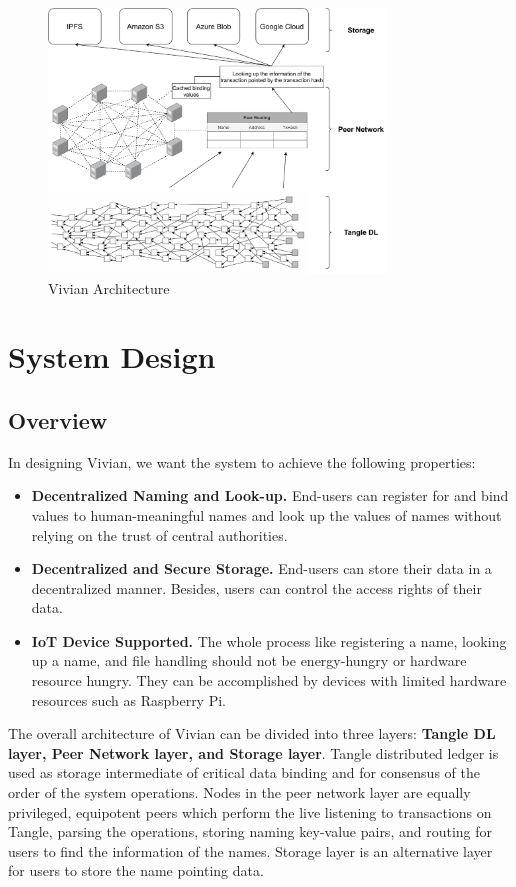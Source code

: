 \begin{figure}[ht]
    \centering
    \includegraphics[width=0.8\textwidth,trim={0 0 0 0},clip]{figs/vivian_architecture.pdf}
    \caption{Vivian Architecture}
    \label{fig:vivian_architecture}
\end{figure}

\section{System Design}
\label{sec:design}

\subsection{Overview}
In designing Vivian, we want the system to achieve the following properties:

\begin{itemize}
    \item \textbf{Decentralized Naming and Look-up.} End-users can register for and bind values to human-meaningful names and look up the values of names without relying on the trust of central authorities.
    \item \textbf{Decentralized and Secure Storage.} End-users can store their data in a decentralized manner. Besides, users can control the access rights of their data.
    \item  \textbf{IoT Device Supported.} The whole process like registering a name, looking up a name, and file handling should not be energy-hungry or hardware resource hungry.
          They can be accomplished by devices with limited hardware resources such as Raspberry Pi.
\end{itemize}

The overall architecture of Vivian can be divided into three layers: \textbf{Tangle DL layer, Peer Network layer, and Storage layer}.
Tangle distributed ledger is used as storage intermediate of critical data binding and for consensus of the order of the system operations.
Nodes in the peer network layer are equally privileged, equipotent peers which perform the live listening to transactions on Tangle, parsing the operations, storing naming key-value pairs, and routing for users to find the information of the names.
Storage layer is an alternative layer for users to store the name pointing data.

